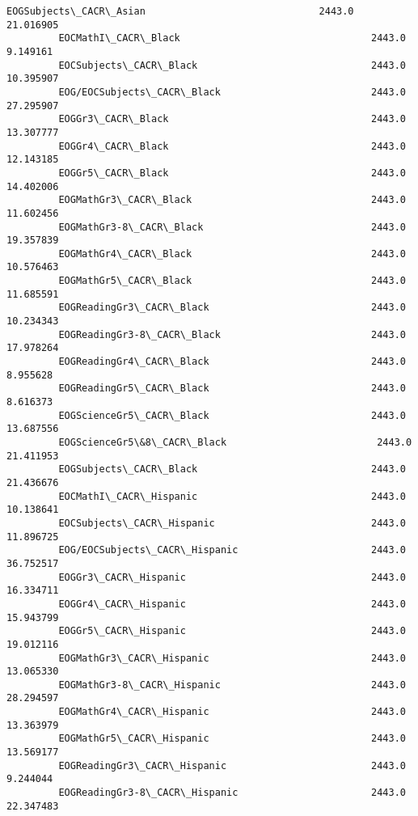\documentclass[11pt]{article}
\begin{document}
\begin{Verbatim}[commandchars=\\\{\}]
         EOGSubjects\_CACR\_Asian                              2443.0      21.016905   
         EOCMathI\_CACR\_Black                                 2443.0       9.149161   
         EOCSubjects\_CACR\_Black                              2443.0      10.395907   
         EOG/EOCSubjects\_CACR\_Black                          2443.0      27.295907   
         EOGGr3\_CACR\_Black                                   2443.0      13.307777   
         EOGGr4\_CACR\_Black                                   2443.0      12.143185   
         EOGGr5\_CACR\_Black                                   2443.0      14.402006   
         EOGMathGr3\_CACR\_Black                               2443.0      11.602456   
         EOGMathGr3-8\_CACR\_Black                             2443.0      19.357839   
         EOGMathGr4\_CACR\_Black                               2443.0      10.576463   
         EOGMathGr5\_CACR\_Black                               2443.0      11.685591   
         EOGReadingGr3\_CACR\_Black                            2443.0      10.234343   
         EOGReadingGr3-8\_CACR\_Black                          2443.0      17.978264   
         EOGReadingGr4\_CACR\_Black                            2443.0       8.955628   
         EOGReadingGr5\_CACR\_Black                            2443.0       8.616373   
         EOGScienceGr5\_CACR\_Black                            2443.0      13.687556   
         EOGScienceGr5\&8\_CACR\_Black                          2443.0      21.411953   
         EOGSubjects\_CACR\_Black                              2443.0      21.436676   
         EOCMathI\_CACR\_Hispanic                              2443.0      10.138641   
         EOCSubjects\_CACR\_Hispanic                           2443.0      11.896725   
         EOG/EOCSubjects\_CACR\_Hispanic                       2443.0      36.752517   
         EOGGr3\_CACR\_Hispanic                                2443.0      16.334711   
         EOGGr4\_CACR\_Hispanic                                2443.0      15.943799   
         EOGGr5\_CACR\_Hispanic                                2443.0      19.012116   
         EOGMathGr3\_CACR\_Hispanic                            2443.0      13.065330   
         EOGMathGr3-8\_CACR\_Hispanic                          2443.0      28.294597   
         EOGMathGr4\_CACR\_Hispanic                            2443.0      13.363979   
         EOGMathGr5\_CACR\_Hispanic                            2443.0      13.569177   
         EOGReadingGr3\_CACR\_Hispanic                         2443.0       9.244044   
         EOGReadingGr3-8\_CACR\_Hispanic                       2443.0      22.347483   

\end{Verbatim}
\end{document}

